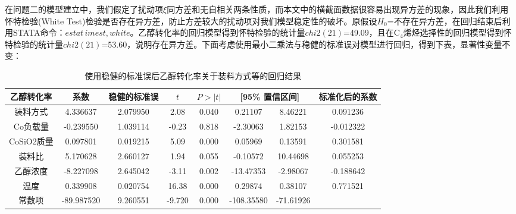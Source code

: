 \documentclass[a4paper,10.5pt]{ctexart}
\begin{document}
\par 在问题二的模型建立中，我们假定了扰动项$\xi$同方差和无自相关两条性质，而本文中的横截面数据很容易出现异方差的现象，因此我们利用怀特检验(White Test)检验是否存在异方差，防止方差较大的扰动项对我们模型稳定性的破坏。原假设$H_0$=不存在异方差，在回归结束后利用STATA命令：$estat\,imest,white$。乙醇转化率的回归模型得到怀特检验的统计量$chi2(21)$=49.09，且在C$_4$烯烃选择性的回归模型得到怀特检验的统计量$chi2(21)$=53.60，说明存在异方差。下面考虑使用最小二乘法与稳健的标准误对模型进行回归，得到下表，显著性变量不变：
~\\
\begin{table}[htbp]
  \centering
  \caption{使用稳健的标准误后乙醇转化率关于装料方式等的回归结果}
    \begin{tabular}{cccccccc}
    \toprule[2pt]
    乙醇转化率 & 系数 & 稳健的标准误 &  $t$    & $P>|t|$ & \multicolumn{2}{c}{ [95\% 置信区间]} & 标准化后的系数 \\
    \midrule
    装料方式  & 4.336637  & 2.079950  & 2.08  & 0.040  & 0.21107  & 8.46221  & 0.091236  \\
     Co负载量 & -0.239550  & 1.039114  & -0.23  & 0.818  & -2.30063  & 1.82153  & -0.012322  \\
     CoSiO2质量  & 0.097801  & 0.019215  & 5.09  & 0.000  & 0.05969  & 0.13591  & 0.301581  \\
     装料比  & 5.170628  & 2.660127  & 1.94  & 0.055  & -0.10572  & 10.44698  & 0.055253  \\
     乙醇浓度  & -8.227098  & 2.645042  & -3.11  & 0.002  & -13.47353  & -2.98067  & -0.188642  \\
     温度   & 0.339908  & 0.020754  & 16.38  & 0.000  & 0.29874  & 0.38107  & 0.771521  \\
     常数项  & -89.987520  & 9.260551  & -9.720  & 0.000  & -108.35580  & -71.61926  &  \\
    \bottomrule[2pt]
    \end{tabular}%
  \label{tab:addlabel}%
\end{table}%
\end{document}
